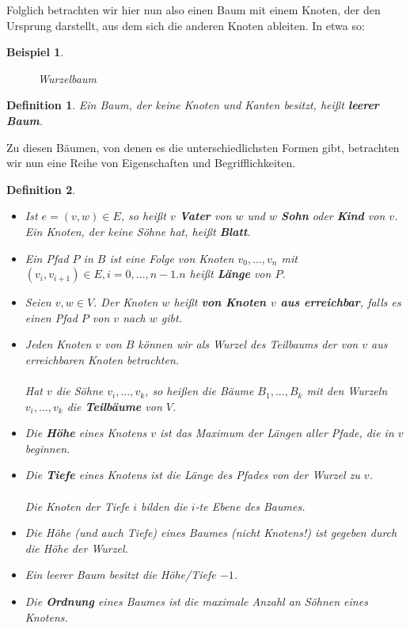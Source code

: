 \documentclass[11pt,a4paper]{scrartcl}
\newtheorem{definition}{Definition}
\newtheorem{example}{Beispiel}
\begin{document}
Folglich betrachten wir hier nun also einen Baum mit einem Knoten, der den Ursprung darstellt, aus dem sich die anderen Knoten ableiten. In etwa so: \\
\begin{example}
\begin{figure}[h]
\centering
{}
\caption{Wurzelbaum}
\end{figure}
\end{example}
\begin{definition}
Ein Baum, der keine Knoten und Kanten besitzt, heißt \textbf{leerer Baum}.
\end{definition}
Zu diesen Bäumen, von denen es die unterschiedlichsten Formen gibt, betrachten wir nun eine Reihe von Eigenschaften und Begrifflichkeiten.
\begin{definition}
\begin{itemize}
\item Ist $e = (v, w) \in E$, so heißt $v$ \textbf{Vater} von $w$ und $w$ \textbf{Sohn} oder \textbf{Kind} von $v$. Ein Knoten, der keine Söhne hat, heißt \textbf{Blatt}.
\item Ein Pfad $P$ in $B$ ist eine Folge von Knoten $v_{0}, ..., v_{n}$ mit $(v_{i}, v_{i+1}) \in E, i = 0, ..., n-1. n$ heißt \textbf{Länge} von $P$.
\item Seien $v, w \in V$. Der Knoten $w$ heißt \textbf{von Knoten $v$ aus erreichbar}, falls es einen Pfad $P$ von $v$ nach $w$ gibt.
\item Jeden Knoten $v$ von $B$ können wir als Wurzel des Teilbaums der von $v$ aus erreichbaren Knoten betrachten. \\\\ Hat $v$ die Söhne $v_{i}, ..., v_{k}$, so heißen die Bäume $B_{1}, ..., B_{k}$ mit den Wurzeln $v_{i}, ..., v_{k}$ die \textbf{Teilbäume} von $V$.
\item Die \textbf{Höhe} eines Knotens $v$ ist das Maximum der Längen aller Pfade, die in $v$ beginnen.
\item Die \textbf{Tiefe} eines Knotens ist die Länge des Pfades von der Wurzel zu $v$. \\\\
Die Knoten der Tiefe $i$ bilden die $i$-te Ebene des Baumes.
\item Die Höhe (und auch Tiefe) eines Baumes (nicht Knotens!) ist gegeben durch die Höhe der Wurzel.
\item Ein leerer Baum besitzt die Höhe/Tiefe $-1$.
\item Die \textbf{Ordnung} eines Baumes ist die maximale Anzahl an Söhnen eines Knotens.
\end{itemize}
\end{definition}
\end{document}
